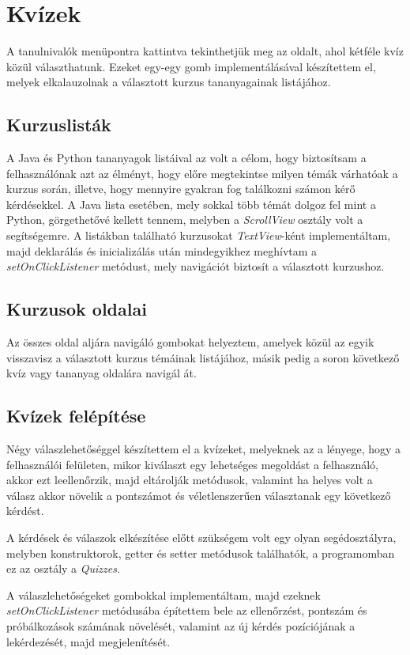 \documentclass{thesis-ekf}
\begin{document}
\section{Kvízek}
A tanulnivalók menüpontra kattintva tekinthetjük meg az oldalt, ahol kétféle kvíz közül választhatunk. Ezeket egy-egy gomb implementálásával készítettem el, melyek elkalauzolnak a választott kurzus tananyagainak listájához. 

\subsection{Kurzuslisták}
A Java és Python tananyagok listáival az volt a célom, hogy biztosítsam a felhasználónak azt az élményt, hogy előre megtekintse milyen témák várhatóak a kurzus során, illetve, hogy mennyire gyakran fog találkozni számon kérő kérdésekkel. A Java lista esetében, mely sokkal több témát dolgoz fel mint a Python, görgethetővé kellett tennem, melyben a \textit{ScrollView} osztály volt a segítségemre. A listákban található kurzusokat \textit{TextView}-ként implementáltam, majd deklarálás és inicializálás után mindegyikhez meghívtam a \textit{setOnClickListener} metódust, mely navigációt biztosít a választott kurzushoz.

\subsection{Kurzusok oldalai}
Az összes oldal aljára navigáló gombokat helyeztem, amelyek közül az egyik visszavisz a választott kurzus témáinak listájához, másik pedig a soron következő kvíz vagy tananyag oldalára navigál át.

\subsection{Kvízek felépítése}
Négy válaszlehetőséggel készítettem el a kvízeket, melyeknek az a lényege, hogy a felhasználói felületen, mikor kiválaszt egy lehetséges megoldást a felhasználó, akkor ezt leellenőrzik, majd eltárolják metódusok, valamint ha helyes volt a válasz akkor növelik a pontszámot és véletlenszerűen választanak egy következő kérdést.

A kérdések és válaszok elkészítése előtt szükségem volt egy olyan segédosztályra, melyben konstruktorok, getter és setter metódusok találhatók, a programomban ez az osztály a \textit{Quizzes}. 

A válaszlehetőségeket gombokkal implementáltam, majd ezeknek \textit{setOnClickListener} metódusába építettem bele az ellenőrzést, pontszám és próbálkozások számának növelését, valamint az új kérdés pozíciójának a lekérdezését, majd megjelenítését.
\end{document}
